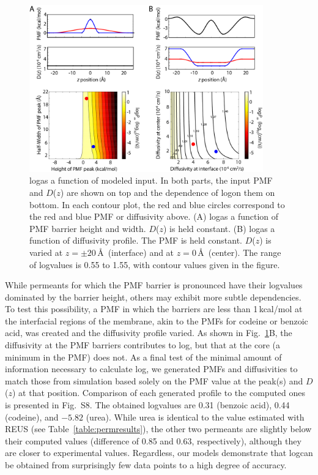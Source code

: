 \begin{figure}[htbp]
\begin{center}
\includegraphics[width=0.9\textwidth]{Figures/models}
\caption[log\perm as a function of modeled inputs]{log\perm as a function of modeled input.  In both parts, the input PMF and $D$($z$) are shown on top and the dependence of log\perm on them on bottom.  In each contour plot, the red and blue circles correspond to the red and blue PMF or diffusivity above.  (A) log\perm as a function of PMF barrier height and width.  $D$($z$) is held constant.  (B) log\perm as a function of diffusivity profile.  The PMF is held constant.  $D$($z$) is varied at $z=\pm 20$\,\AA~(interface) and at $z=0$\,\AA~(center).  The range of log\perm values is 0.55 to 1.55, with contour values given in the figure.}
\label{fig:models}
\end{center}
\end{figure}

\par While permeants for which the PMF barrier is pronounced have their log\perm values dominated by the barrier height, others may exhibit more subtle dependencies.  To test this possibility, a PMF in which the barriers are less than 1\,kcal/mol at the interfacial regions of the membrane, akin to the PMFs for codeine or benzoic acid, was created and the diffusivity profile varied.  As shown in Fig.~\ref{fig:models}B, the diffusivity at the PMF barriers contributes to log\perm, but that at the core (a minimum in the PMF) does not.  As a final test of the minimal amount of information necessary to calculate log\perm, we generated PMFs and diffusivities to match those from simulation based solely on the PMF value at the peak(s) and $D$($z$) at that position.  Comparison of each generated profile to the computed ones is presented in Fig.~S8.  The obtained log\perm values are 0.31 (benzoic acid), 0.44 (codeine), and $-5.82$ (urea).  While urea is identical to the value estimated with REUS (see Table~\ref{table:permresults}), the other two permeants are slightly below their computed values (difference of 0.85 and 0.63, respectively), although they are closer to experimental values.  Regardless, our models demonstrate that log\perm can be obtained from surprisingly few data points to a high degree of accuracy.

